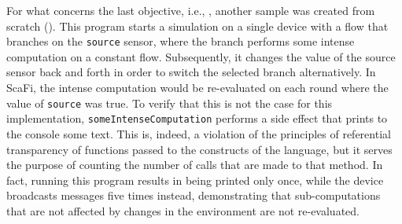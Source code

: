 For what concerns the last objective, i.e., , another sample was created from scratch ().
%
This program starts a simulation on a single device with a flow that branches on the \texttt{source} sensor, where the  branch performs some intense computation on a constant flow.
%
Subsequently, it changes the value of the source sensor back and forth in order to switch the selected branch alternatively.
%
In ScaFi, the intense computation would be re-evaluated on each round where the value of \texttt{source} was true.
%
To verify that this is not the case for this implementation, \texttt{someIntenseComputation} performs a side effect that prints to the console some text.
%
This is, indeed, a violation of the principles of referential transparency of functions passed to the constructs of the language, but it serves the purpose of counting the number of calls that are made to that method.
%
In fact, running this program results in  being printed only once, while the device broadcasts messages five times instead, demonstrating that sub-computations that are not affected by changes in the environment are not re-evaluated.
%

